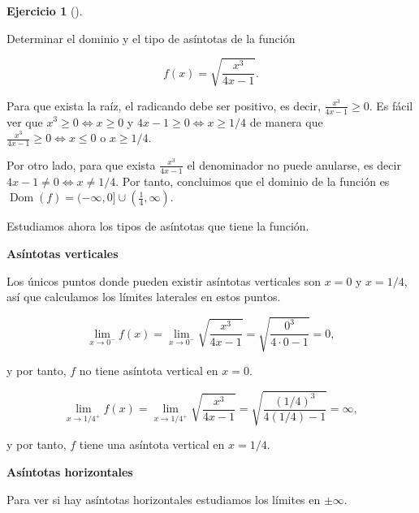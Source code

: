 \documentclass[
  a4paper,
]{scrreport}
\theoremstyle{definition}
\newtheorem{exercise}{Ejercicio}[chapter]
\theoremstyle{remark}
\begin{document}
\begin{exercise}[]\protect\hypertarget{exr-4}{}\label{exr-4}

Determinar el dominio y el tipo de asíntotas de la función

\[f(x)=\sqrt{\frac{x^3}{4x-1}}.\]

\end{exercise}

\begin{tcolorbox}[enhanced jigsaw, opacityback=0, title=\textcolor{quarto-callout-tip-color}{\faLightbulb}\hspace{0.5em}{Solución}, toptitle=1mm, colframe=quarto-callout-tip-color-frame, leftrule=.75mm, breakable, colback=white, left=2mm, bottomtitle=1mm, rightrule=.15mm, opacitybacktitle=0.6, arc=.35mm, coltitle=black, titlerule=0mm, colbacktitle=quarto-callout-tip-color!10!white, bottomrule=.15mm, toprule=.15mm]

Para que exista la raíz, el radicando debe ser positivo, es decir,
\(\frac{x^3}{4x-1}\geq 0\). Es fácil ver que
\(x^3\geq 0\Leftrightarrow x\geq 0\) y
\(4x-1\geq 0\Leftrightarrow x\geq 1/4\) de manera que
\(\frac{x^3}{4x-1}\geq 0\Leftrightarrow x\leq 0 \mbox{ o } x\geq 1/4\).

Por otro lado, para que exista \(\frac{x^3}{4x-1}\) el denominador no
puede anularse, es decir \(4x-1\neq 0 \Leftrightarrow x\neq 1/4\). Por
tanto, concluimos que el dominio de la función es
\(\operatorname{Dom}(f)=(-\infty, 0]\cup (\frac{1}{4},\infty)\).

Estudiamos ahora los tipos de asíntotas que tiene la función.

\textbf{Asíntotas verticales}

Los únicos puntos donde pueden existir asíntotas verticales son \(x=0\)
y \(x=1/4\), así que calculamos los límites laterales en estos puntos.

\[
\lim_{x\to 0^-}f(x) = \lim_{x\to 0^-} \sqrt{\frac{x^3}{4x-1}} = \sqrt{\frac{0^3}{4\cdot 0-1}} = 0,
\]

y por tanto, \(f\) no tiene asíntota vertical en \(x=0\).

\[
\lim_{x\to 1/4^+}f(x) = \lim_{x\to 1/4^+} \sqrt{\frac{x^3}{4x-1}} = \sqrt{\frac{(1/4)^3}{4(1/4)-1}} = \infty,
\]

y por tanto, \(f\) tiene una asíntota vertical en \(x=1/4\).

\textbf{Asíntotas horizontales}

Para ver si hay asíntotas horizontales estudiamos los límites en
\(\pm \infty\).


\end{tcolorbox}
\end{document}
